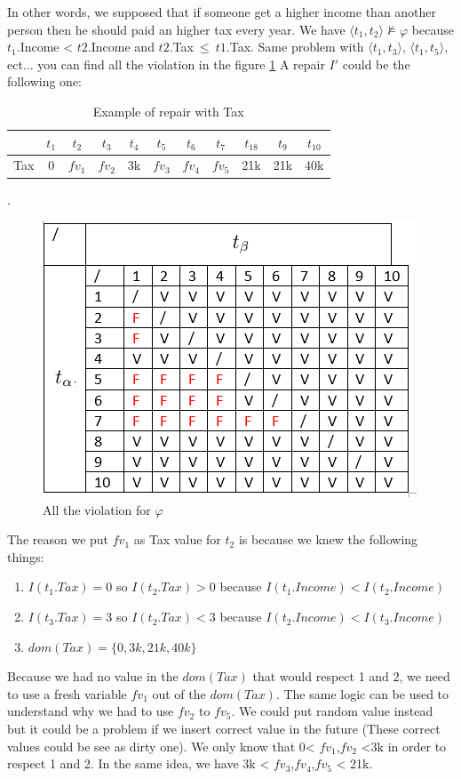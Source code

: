 \documentclass[letterpaper, 12pt]{report}
\begin{document}
In other words, we supposed that if someone get a higher income than another person then he should paid an higher tax every year. We have $ \langle t_1,t_2 \rangle \not\models \varphi $ because $t_1$.Income < $t2.$Income and $t2$.Tax$\ \leq\ t1$.Tax. Same problem with $ \langle t_1,t_3 \rangle$, $ \langle t_1,t_5 \rangle$, ect... you can find all the violation in the figure \ref{BadTax} A repair $I'$ could be the following one:

\begin{table}[H]
	\centering
	\begin{tabular}{|c|c c c c c c c c c c|}
	\hline
	   & $t_1$ & $t_2$ & $t_3$ &$t_4$ &$t_5$ &$t_6$ &$t_7$ &$t_18$ &$t_9$ &$t_10$ \\
	\hline
	 Tax & 0 & \color{red} $fv_1$ & \color{red} $fv_2$& 3k & \color{orange}$fv_3$& \color{orange} $fv_4$& \color{orange} $fv_5$& 21k & 21k & 40k\\
	 \hline
	\end{tabular}
	\caption{\label{tableExample} Example of repair with Tax}.
\end{table}


\begin{figure}
	\centering
	\includegraphics[scale=1]{img/TaxBad}
	\caption{\label{BadTax} All the violation for $\varphi$}
\end{figure}

The reason we put $fv_1$ as Tax value for $t_2$ is because we knew the following things:
\begin{enumerate}

\item $I(t_1.Tax)=0$ so $I(t_2.Tax)>0$ because $I(t_1.Income)<I(t_2.Income)$
\item $I(t_3.Tax)=3$ so $I(t_2.Tax)<3$ because $I(t_2.Income)<I(t_3.Income)$
\item $dom(Tax) = \{0,3k,21k,40k\}$

\end{enumerate}
Because we had no value in the $dom(Tax)$ that would respect 1 and 2, we need to use a fresh variable $fv_1$ out of the $dom(Tax)$. The same  logic can be used to understand why we had to use $fv_2$ to $fv_5$. We could put random value instead but it could be a problem if we insert correct value in the future (These correct values could be see as dirty one).
We only know that 0< $fv_1$,$fv_2$ <3k in order to respect 1 and 2. In the same idea, we have 3k < $fv_3$,$fv_4$,$fv_5$ < 21k.
\end{document}
